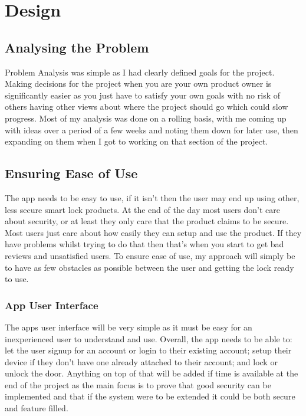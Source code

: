 \chapter{Design}
\label{chap:design}

\section{Analysing the Problem}
Problem Analysis was simple as I had clearly defined goals for the project. Making decisions for the project when you are your own product owner is significantly easier as you just have to satisfy your own goals with no risk of others having other views about where the project should go which could slow progress. Most of my analysis was done on a rolling basis, with me coming up with ideas over a period of a few weeks and noting them down for later use, then expanding on them when I got to working on that section of the project.

\section{Ensuring Ease of Use}
The app needs to be easy to use, if it isn't then the user may end up using other, less secure smart lock products. At the end of the day most users don't care about security, or at least they only care that the product claims to be secure. Most users just care about how easily they can setup and use the product. If they have problems whilst trying to do that then that's when you start to get bad reviews and unsatisfied users. To ensure ease of use, my approach will simply be to have as few obstacles as possible between the user and getting the lock ready to use.

\subsection{App User Interface}
The apps user interface will be very simple as it must be easy for an inexperienced user to understand and use. Overall, the app needs to be able to: let the user signup for an account or login to their existing account; setup their device if they don't have one already attached to their account; and lock or unlock the door. Anything on top of that will be added if time is available at the end of the project as the main focus is to prove that good security can be implemented and that if the system were to be extended it could be both secure and feature filled.

